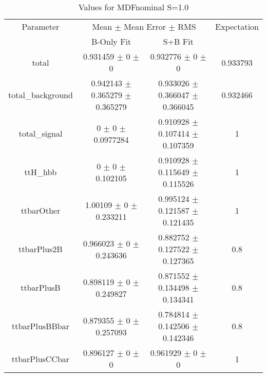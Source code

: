 \begin{table}
\centering
\caption{Values for MDFnominal S=1.0}
\begin{tabular}{cccc}
\toprule
Parameter & \multicolumn{2}{c}{Mean $\pm$ Mean Error $\pm$ RMS} & Expectation\\
 & B-Only Fit & S+B Fit & \\
\midrule
total & \num{0.931459} $\pm$ \num{0} $\pm$ \num{0} & \num{0.932776} $\pm$ \num{0} $\pm$ \num{0} & \num{0.933793}\\
total\_background & \num{0.942143} $\pm$ \num{0.365279} $\pm$ \num{0.365279} & \num{0.933026} $\pm$ \num{0.366047} $\pm$ \num{0.366045} & \num{0.932466}\\
total\_signal & \num{0} $\pm$ \num{0} $\pm$ \num{0.0977284} & \num{0.910928} $\pm$ \num{0.107414} $\pm$ \num{0.107359} & \num{1}\\
ttH\_hbb & \num{0} $\pm$ \num{0} $\pm$ \num{0.102105} & \num{0.910928} $\pm$ \num{0.115649} $\pm$ \num{0.115526} & \num{1}\\
ttbarOther & \num{1.00109} $\pm$ \num{0} $\pm$ \num{0.233211} & \num{0.995124} $\pm$ \num{0.121587} $\pm$ \num{0.121435} & \num{1}\\
ttbarPlus2B & \num{0.966023} $\pm$ \num{0} $\pm$ \num{0.243636} & \num{0.882752} $\pm$ \num{0.127522} $\pm$ \num{0.127365} & \num{0.8}\\
ttbarPlusB & \num{0.898119} $\pm$ \num{0} $\pm$ \num{0.249827} & \num{0.871552} $\pm$ \num{0.134498} $\pm$ \num{0.134341} & \num{0.8}\\
ttbarPlusBBbar & \num{0.879355} $\pm$ \num{0} $\pm$ \num{0.257093} & \num{0.784814} $\pm$ \num{0.142506} $\pm$ \num{0.142346} & \num{0.8}\\
ttbarPlusCCbar & \num{0.896127} $\pm$ \num{0} $\pm$ \num{0} & \num{0.961929} $\pm$ \num{0} $\pm$ \num{0} & \num{1}\\
\bottomrule
\end{tabular}
\end{table}